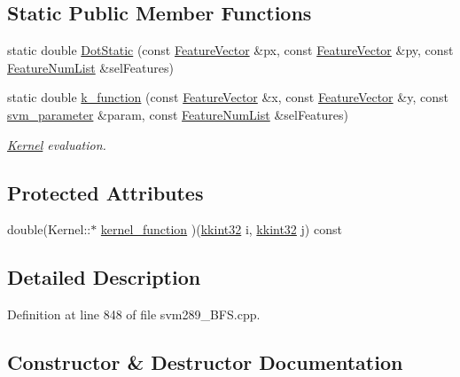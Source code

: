 \subsection*{Static Public Member Functions}
\begin{DoxyCompactItemize}
\item 
static double \hyperlink{class_s_v_m289___b_f_s_1_1_kernel_ab1c134f73d41dc218d34e7c2f956a1ba}{Dot\+Static} (const \hyperlink{class_k_k_m_l_l_1_1_feature_vector}{Feature\+Vector} \&px, const \hyperlink{class_k_k_m_l_l_1_1_feature_vector}{Feature\+Vector} \&py, const \hyperlink{class_k_k_m_l_l_1_1_feature_num_list}{Feature\+Num\+List} \&sel\+Features)
\item 
static double \hyperlink{class_s_v_m289___b_f_s_1_1_kernel_aca1884c528ca8bb19f764e16a51a0acd}{k\+\_\+function} (const \hyperlink{class_k_k_m_l_l_1_1_feature_vector}{Feature\+Vector} \&x, const \hyperlink{class_k_k_m_l_l_1_1_feature_vector}{Feature\+Vector} \&y, const \hyperlink{struct_s_v_m289___b_f_s_1_1svm__parameter}{svm\+\_\+parameter} \&param, const \hyperlink{class_k_k_m_l_l_1_1_feature_num_list}{Feature\+Num\+List} \&sel\+Features)
\begin{DoxyCompactList}\small\item\em \hyperlink{class_s_v_m289___b_f_s_1_1_kernel}{Kernel} evaluation. \end{DoxyCompactList}\end{DoxyCompactItemize}
\subsection*{Protected Attributes}
\begin{DoxyCompactItemize}
\item 
double(Kernel\+::$\ast$ \hyperlink{class_s_v_m289___b_f_s_1_1_kernel_a53bab2e9f1cf2a9c8ade1e80237cda65}{kernel\+\_\+function} )(\hyperlink{namespace_k_k_b_a8fa4952cc84fda1de4bec1fbdd8d5b1b}{kkint32} i, \hyperlink{namespace_k_k_b_a8fa4952cc84fda1de4bec1fbdd8d5b1b}{kkint32} j) const 
\end{DoxyCompactItemize}


\subsection{Detailed Description}


Definition at line 848 of file svm289\+\_\+\+B\+F\+S.\+cpp.



\subsection{Constructor \& Destructor Documentation}
